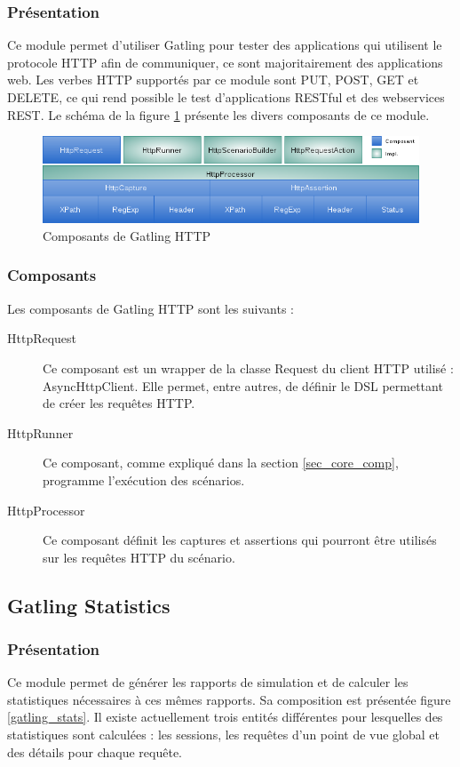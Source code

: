 \subsubsection{Présentation}
Ce module permet d'utiliser Gatling pour tester des applications qui utilisent le protocole HTTP afin de communiquer, ce sont majoritairement des applications web. Les verbes HTTP supportés par ce module sont PUT, POST, GET et DELETE, ce qui rend possible le test d'applications RESTful et des webservices REST. Le schéma de la figure \ref{gatling_http} présente les divers composants de ce module.

\begin{figure}[h]
\begin{center}
\includegraphics[width=400pt]{img/gatling_http.png}
\end{center}
\caption{Composants de Gatling HTTP}
\label{gatling_http}
\end{figure}

\subsubsection{Composants}
Les composants de Gatling HTTP sont les suivants :
\begin{description}
\item[HttpRequest] Ce composant est un wrapper de la classe Request du client HTTP utilisé : AsyncHttpClient\cite{www_ahc}. Elle permet, entre autres, de définir le DSL permettant de créer les requêtes HTTP.
\item[HttpRunner] Ce composant, comme expliqué dans la section \ref{sec_core_comp}, programme l'exécution des scénarios.
\item[HttpProcessor] Ce composant définit les captures et assertions qui pourront être utilisés sur les requêtes HTTP du scénario.
\end{description}

\subsection{Gatling Statistics}
\subsubsection{Présentation}
Ce module permet de générer les rapports de simulation et de calculer les statistiques nécessaires à ces mêmes rapports. Sa composition est présentée figure \ref{gatling_stats}. Il existe actuellement trois entités différentes pour lesquelles des statistiques sont calculées : les sessions, les requêtes d'un point de vue global et des détails pour chaque requête.

